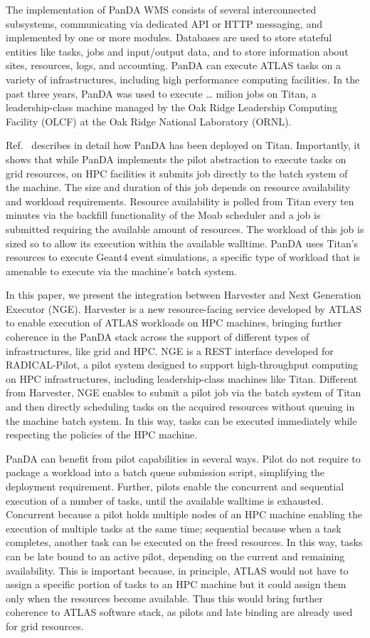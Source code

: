 \documentclass{webofc}
\begin{document}
The implementation of PanDA WMS consists of several interconnected subsystems, communicating via dedicated API or HTTP messaging, and implemented by one or more modules. Databases are used to store stateful entities like tasks, jobs and input/output data, and to store information about sites, resources, logs, and accounting. PanDA can execute ATLAS tasks on a variety of infrastructures, including high performance computing facilities. In the past three years, PanDA was used to execute … milion jobs on Titan, a leadership-class machine managed by the Oak Ridge Leadership Computing Facility (OLCF) at the Oak Ridge National Laboratory (ORNL). 

Ref.~\cite{panda-paper} describes in detail how PanDA has been deployed on Titan. Importantly, it shows that while PanDA implements the pilot abstraction to execute tasks on grid resources, on HPC facilities it submits job directly to the batch system of the machine. The size and duration of this job depends on resource availability and workload requirements. Resource availability is polled from Titan every ten minutes via the backfill functionality of the Moab scheduler and a job is submitted requiring the available amount of resources. The workload of this job is sized so to allow its execution within the available walltime. PanDA uses Titan’s resources to execute Geant4 event simulations, a specific type of workload that is amenable to execute via the machine’s batch system. 

In this paper, we present the integration between Harvester and Next Generation Executor (NGE). Harvester is a new resource-facing service developed by ATLAS to enable execution of ATLAS workloads on HPC machines, bringing further coherence in the PanDA stack across the support of different types of infrastructures, like grid and HPC. NGE is a REST interface developed for RADICAL-Pilot, a pilot system designed to support high-throughput computing on HPC infrastructures, including leadership-class machines like Titan. Different from Harvester, NGE enables to submit a pilot job via the batch system of Titan and then directly scheduling tasks on the acquired resources without queuing in the machine batch system. In this way, tasks can be executed immediately while respecting the policies of the HPC machine.

PanDA can benefit from pilot capabilities in several ways. Pilot do not require to package a workload into a batch queue submission script, simplifying the deployment requirement. Further, pilots enable the concurrent and sequential execution of a number of tasks, until the available walltime is exhausted. Concurrent because a pilot holds multiple nodes of an HPC machine enabling the execution of multiple tasks at the same time; sequential because when a task completes, another task can be executed on the freed resources. In this way, tasks can be late bound to an active pilot, depending on the current and remaining availability. This is important because, in principle, ATLAS would not have to assign a specific portion of tasks to an HPC machine but it could assign them only when the resources become available. Thus this would bring further coherence to ATLAS software stack, as pilots and late binding are already used for grid resources.
\end{document}
